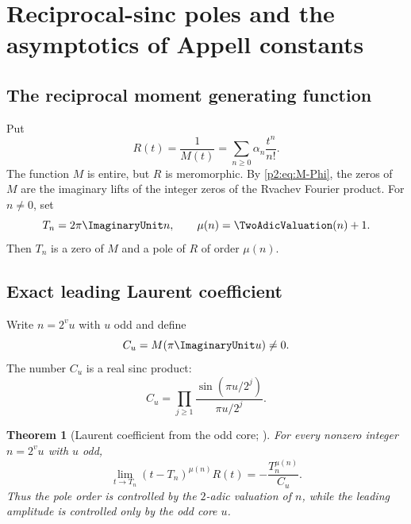 \documentclass[11pt,oneside]{article}
\numberwithin{equation}{section}
\newtheorem{theorem}{Theorem}[section]
\theoremstyle{definition}
\theoremstyle{remark}
\begin{document}
\section{Reciprocal-sinc poles and the asymptotics of Appell constants}
\label{p2:sec:poles}

\subsection{The reciprocal moment generating function}

Put
\begin{equation}
 R(t)=\frac1{M(t)}
 =\sum_{n\ge0}\alpha_n\frac{t^n}{n!}.
 \label{p2:eq:R-def}
\end{equation}
The function $M$ is entire, but $R$ is meromorphic.  By \eqref{p2:eq:M-Phi}, the zeros of $M$ are the
imaginary lifts of the integer zeros of the Rvachev Fourier product.  For $n\ne0$, set
\begin{equation}
 T_n=2\pi\ImaginaryUnit n,
 \qquad
 \mu(n)=\TwoAdicValuation(n)+1.
 \label{p2:eq:T-mu}
\end{equation}
Then $T_n$ is a zero of $M$ and a pole of $R$ of order $\mu(n)$.

\subsection{Exact leading Laurent coefficient}

Write $n=2^vu$ with $u$ odd and define
\begin{equation}
 C_u=M(\pi\ImaginaryUnit u)\ne0.
 \label{p2:eq:Cu}
\end{equation}
The number $C_u$ is a real sinc product:
\begin{equation}
 C_u=\prod_{j\ge1}\frac{\sin(\pi u/2^j)}{\pi u/2^j}.
 \label{p2:eq:Cu-product}
\end{equation}

\begin{theorem}[Laurent coefficient from the odd core; \statusnew]
\label{p2:thm:Laurent-leading}
For every nonzero integer $n=2^vu$ with $u$ odd,
\begin{equation}
 \boxed{
 \lim_{t\to T_n}(t-T_n)^{\mu(n)}R(t)
 =-\frac{T_n^{\mu(n)}}{C_u}.
 }
 \label{p2:eq:Laurent-leading}
\end{equation}
Thus the pole order is controlled by the $2$-adic valuation of $n$, while the leading amplitude is
controlled only by the odd core $u$.
\end{theorem}
\end{document}
